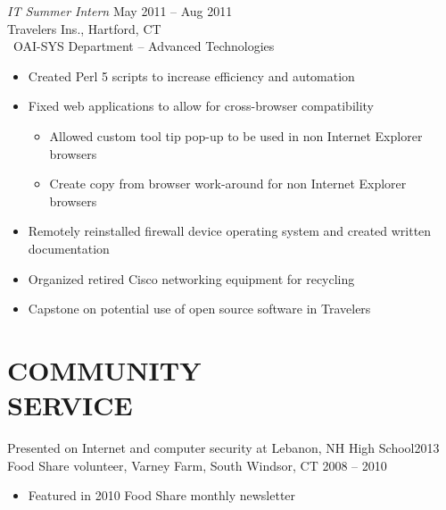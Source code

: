 \documentclass[margin]{res}
\begin{document}
\begin{resume}
                     {\sl IT Summer Intern} \hfill  May 2011 -- Aug 2011 \\
                     Travelers Ins., Hartford, CT\\\
                     OAI-SYS Department -- Advanced Technologies
                     \begin{itemize}   \itemsep -2pt %
                         \item Created Perl 5 scripts to increase efficiency and 
                               automation
                         \item Fixed web applications to allow for cross-browser 
                               compatibility
                         \begin{itemize} \itemsep -2pt %
                             \item Allowed custom tool tip pop-up to be used in non
                                   Internet Explorer \\browsers
                             \item Create copy from browser work-around for non
                                   Internet Explorer \\browsers
                         \end{itemize}
                         \item Remotely reinstalled firewall device operating
                               system and created written \\documentation
                         \item Organized retired Cisco networking equipment for
                               recycling
                         \nopagebreak[4]
                         \item Capstone on potential use of open source software 
                               in Travelers
                     \end{itemize} 
 
\section{COMMUNITY \\ SERVICE} 
                Presented on Internet and computer security at Lebanon, 
                NH High School\hfill 2013\\
                Food Share volunteer, Varney Farm, South Windsor, 
                CT \hfill 2008 -- 2010
                \begin{itemize}
                    \item Featured in 2010 Food Share monthly newsletter
                \end{itemize}
     


\end{resume}
\end{document}
